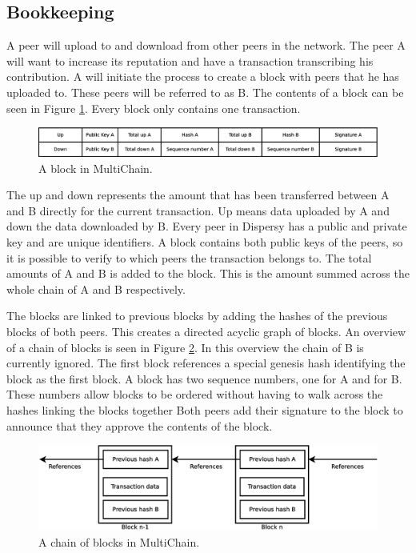 \subsection{Bookkeeping}
A peer will upload to and download from other peers in the network.
The peer A will want to increase its reputation and have a transaction transcribing his contribution.
A will initiate the process to create a block with peers that he has uploaded to.
These peers will be referred to as B.
The contents of a block can be seen in Figure \ref{fig:block}.
Every block only contains one transaction.

\begin{figure}
	\centerline{\includegraphics[scale=0.3]{design/figs/block.eps}}
	\caption{A block in MultiChain.}
	\label{fig:block}

\end{figure}

The up and down represents the amount that has been transferred between A and B directly for the current transaction.
Up means data uploaded by A and down the data downloaded by B.
Every peer in Dispersy has a public and private key and are unique identifiers.
A block contains both public keys of the peers,
so it is possible to verify to which peers the transaction belongs to.
The total amounts of A and B is added to the block.
This is the amount summed across the whole chain of A and B respectively.

The blocks are linked to previous blocks by adding the hashes of the previous blocks of both peers.
This creates a directed acyclic graph of blocks.
An overview of a chain of blocks is seen in Figure \ref{fig:transaction-chain}.
In this overview the chain of B is currently ignored.
The first block references a special genesis hash identifying the block as the first block.
A block has two sequence numbers, one for A and for B.
These numbers allow blocks to be ordered without having to walk across the hashes linking the blocks together
Both peers add their signature to the block to announce that they approve the contents of the block.

\begin{figure}
	\centerline{\includegraphics[scale=0.3]{design/figs/transaction-chain.eps}}
	\caption{A chain of blocks in MultiChain.}
	\label{fig:transaction-chain}
\end{figure}
